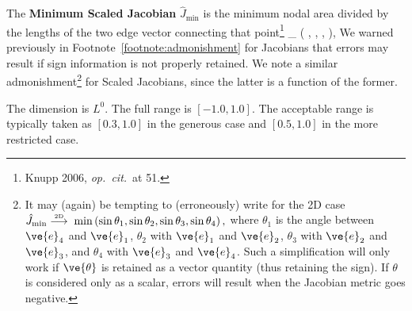 \documentclass[14pt,letterpaper,fleqn]{extreport}
\begin{document}
The {\bf Minimum Scaled Jacobian} $\hat{J}_{\min}$ is the minimum nodal area divided by the 
lengths of the two edge vector connecting that point\footnote{Knupp 2006, {\em op.~cit.}~at 51.}
\be 
{}_{\min}  \min
  \left(
    , 
    ,
    ,
  \right),
\ee 
%
We warned previously in Footnote~\ref{footnote:admonishment} for Jacobians that 
errors may result if sign information is not properly retained.  We 
note a similar admonishment\footnote{It may (again) be tempting to (erroneously) 
write for the 2D case 
$\hat{J}_{\min} \overset{\tiny \mbox{2D}}{\longrightarrow} \; \min
  \left(
    \sin \theta_1, \sin \theta_2, \sin \theta_3, \sin \theta_4
  \right),$
where $\theta_1$ is the angle between $\ve{e}_4$ and $\ve{e}_1$, 
$\theta_2$ with $\ve{e}_1$ and $\ve{e}_2$, 
$\theta_3$ with $\ve{e}_2$ and $\ve{e}_3$, and
$\theta_4$ with $\ve{e}_3$ and $\ve{e}_4$.
Such a simplification will only work if $\ve{\theta}$ is retained as a vector quantity (thus 
retaining the sign).  If $\theta$ is considered only as a scalar, errors will result when
the Jacobian metric goes negative.} for Scaled Jacobians, since the latter is a function of the
former.

The dimension is $L^0$.  
The full range is  $[-1.0, 1.0]$.  
The acceptable range is typically taken as $[0.3, 1.0]$ in the generous case and 
$[0.5, 1.0]$ in the more restricted case.


\end{document}
